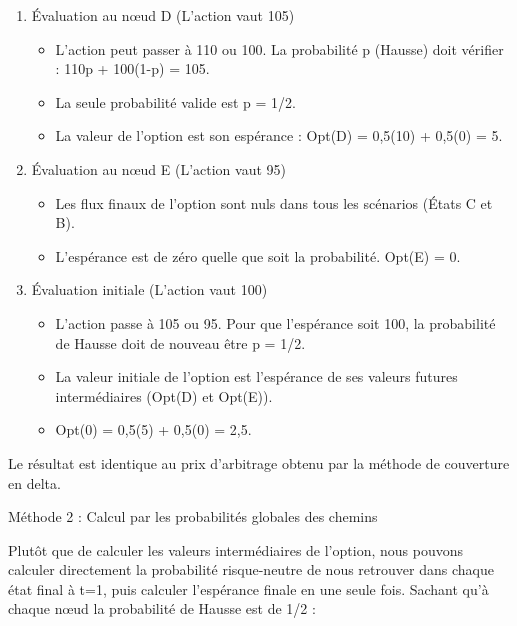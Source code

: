 \begin{enumerate}[label=Étape \arabic* :, leftmargin=*]
    \item Évaluation au nœud D (L'action vaut 105)
    \begin{itemize}[label=$\cdot$]
        \item L'action peut passer à 110 ou 100. La probabilité p (Hausse) doit vérifier : 110p + 100(1-p) = 105.
        \item La seule probabilité valide est p = 1/2.
        \item La valeur de l'option est son espérance : Opt(D) = 0,5(10) + 0,5(0) = 5.
    \end{itemize}

    \vspace{0.2cm}
    \item Évaluation au nœud E (L'action vaut 95)
    \begin{itemize}[label=$\cdot$]
        \item Les flux finaux de l'option sont nuls dans tous les scénarios (États C et B).
        \item L'espérance est de zéro quelle que soit la probabilité. Opt(E) = 0.
    \end{itemize}

    \vspace{0.2cm}
    \item Évaluation initiale (L'action vaut 100)
    \begin{itemize}[label=$\cdot$]
        \item L'action passe à 105 ou 95. Pour que l'espérance soit 100, la probabilité de Hausse doit de nouveau être p = 1/2.
        \item La valeur initiale de l'option est l'espérance de ses valeurs futures intermédiaires (Opt(D) et Opt(E)).
        \item Opt(0) = 0,5(5) + 0,5(0) = 2,5.
    \end{itemize}
\end{enumerate}
Le résultat est identique au prix d'arbitrage obtenu par la méthode de couverture en delta.

Méthode 2 : Calcul par les probabilités globales des chemins

Plutôt que de calculer les valeurs intermédiaires de l'option, nous pouvons calculer directement la probabilité risque-neutre de nous retrouver dans chaque état final à t=1, puis calculer l'espérance finale en une seule fois. Sachant qu'à chaque nœud la probabilité de Hausse est de 1/2 :

